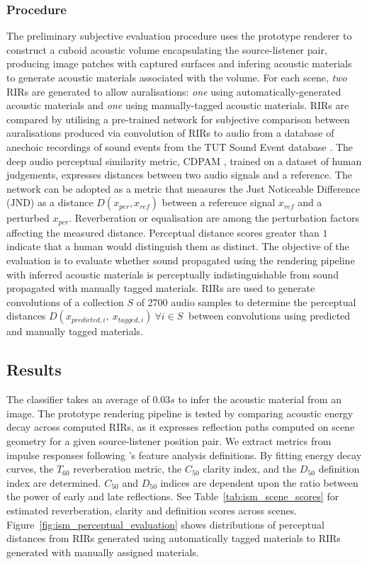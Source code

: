 \subsubsection{Procedure}
The preliminary subjective evaluation procedure uses the prototype renderer to construct a cuboid acoustic volume encapsulating the source-listener pair, producing image patches with captured surfaces and infering acoustic materials to generate acoustic materials associated with the volume. For each scene, \emph{two} RIRs are generated to allow auralisations: \emph{one} using automatically-generated acoustic materials and \emph{one} using manually-tagged acoustic materials. RIRs are compared by utilising a pre-trained network for subjective comparison between auralisations produced via convolution of RIRs to audio from a database of anechoic recordings of sound events from the TUT Sound Event database \citep{sharath_adavanne_2018_1237752}. The deep audio perceptual similarity metric, CDPAM \citep{manocha2021cdpam}, trained on a dataset of human judgements, expresses distances between two audio signals and a reference. The network can be adopted as a metric that measures the Just Noticeable Difference (JND) as a distance $D(x_{per}, x_{ref})$ between a reference signal $x_{ref}$ and a perturbed $x_{per}$. Reverberation or equalisation are among the perturbation factors affecting the measured distance. Perceptual distance scores greater than $1$ indicate that a human would distinguish them as distinct. The objective of the evaluation is to evaluate whether sound propagated using the rendering pipeline with inferred acoustic materials is perceptually indistinguishable from sound propagated with manually tagged materials. RIRs are used to generate convolutions of a collection $S$ of 2700 audio samples to determine the perceptual distances $D(x_{predicted, i},~x_{tagged, i})~\forall i \in S~$ between convolutions using predicted and manually tagged materials.\par

\subsection{Results}
The classifier takes an average of $0.03s$ to infer the acoustic material from an image. The prototype rendering pipeline is tested by comparing acoustic energy decay across computed RIRs, as it expresses reflection paths computed on scene geometry for a given source-listener position pair. We extract metrics from impulse responses following \cite{lima_RIR_Parameters}'s feature analysis definitions. By fitting energy decay curves, the $T_{60}$ reverberation metric, the $C_{50}$ clarity index, and the $D_{50}$ definition index are determined. $C_{50}$ and $D_{50}$ indices are dependent upon the ratio between the power of early and late reflections. See Table~\ref{tab:ism_scene_scores} for estimated reverberation, clarity and definition scores across scenes. Figure~\ref{fig:ism_perceptual_evaluation} shows distributions of perceptual distances from RIRs generated using automatically tagged materials to RIRs generated with manually assigned materials. \par


